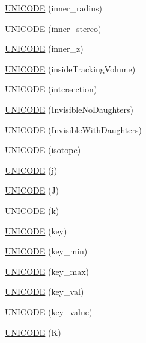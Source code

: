 \begin{DoxyCompactItemize}
\item 
\hyperlink{namespace_d_d4hep_1_1_x_m_l_af8394dd5806960d0d54c04be776dff7d}{U\+N\+I\+C\+O\+DE} (inner\+\_\+radius)
\item 
\hyperlink{namespace_d_d4hep_1_1_x_m_l_a39bafd71ec3133cc21736abf2e9d631a}{U\+N\+I\+C\+O\+DE} (inner\+\_\+stereo)
\item 
\hyperlink{namespace_d_d4hep_1_1_x_m_l_aaa87719f357bec899257b32769f86ab9}{U\+N\+I\+C\+O\+DE} (inner\+\_\+z)
\item 
\hyperlink{namespace_d_d4hep_1_1_x_m_l_a3ae595669e40f727e23c89d11612b7a5}{U\+N\+I\+C\+O\+DE} (inside\+Tracking\+Volume)
\item 
\hyperlink{namespace_d_d4hep_1_1_x_m_l_a597e217c746431268c6b96122c13fc75}{U\+N\+I\+C\+O\+DE} (intersection)
\item 
\hyperlink{namespace_d_d4hep_1_1_x_m_l_abc8efddf185faa2be9c966015e442261}{U\+N\+I\+C\+O\+DE} (Invisible\+No\+Daughters)
\item 
\hyperlink{namespace_d_d4hep_1_1_x_m_l_a9e9ef0fa1a9d0ff3b077169b722887fd}{U\+N\+I\+C\+O\+DE} (Invisible\+With\+Daughters)
\item 
\hyperlink{namespace_d_d4hep_1_1_x_m_l_a56f93391cd06d15047599fd53541e8e7}{U\+N\+I\+C\+O\+DE} (isotope)
\item 
\hyperlink{namespace_d_d4hep_1_1_x_m_l_a361a5dd420db207570ade65425be05e2}{U\+N\+I\+C\+O\+DE} (j)
\item 
\hyperlink{namespace_d_d4hep_1_1_x_m_l_af88b951d5a98494ffe19ce7f80cc9a15}{U\+N\+I\+C\+O\+DE} (J)
\item 
\hyperlink{namespace_d_d4hep_1_1_x_m_l_af9def7d272fa859eabb301c870d2bb32}{U\+N\+I\+C\+O\+DE} (k)
\item 
\hyperlink{namespace_d_d4hep_1_1_x_m_l_a304f826d7986aa2c7d716adeeed1d301}{U\+N\+I\+C\+O\+DE} (key)
\item 
\hyperlink{namespace_d_d4hep_1_1_x_m_l_acba7a7a0c644ec6952e6c563d8b08a9e}{U\+N\+I\+C\+O\+DE} (key\+\_\+min)
\item 
\hyperlink{namespace_d_d4hep_1_1_x_m_l_aa975760f54641fb9c4ec5783659f568c}{U\+N\+I\+C\+O\+DE} (key\+\_\+max)
\item 
\hyperlink{namespace_d_d4hep_1_1_x_m_l_a75939c2c758720cdd66f7ffb88c9e964}{U\+N\+I\+C\+O\+DE} (key\+\_\+val)
\item 
\hyperlink{namespace_d_d4hep_1_1_x_m_l_a2ce43d87a10ebbff062e4465f110e17d}{U\+N\+I\+C\+O\+DE} (key\+\_\+value)
\item 
\hyperlink{namespace_d_d4hep_1_1_x_m_l_a045c70ead754b0cc61881ad0dddd071c}{U\+N\+I\+C\+O\+DE} (K)

\end{DoxyCompactItemize}
